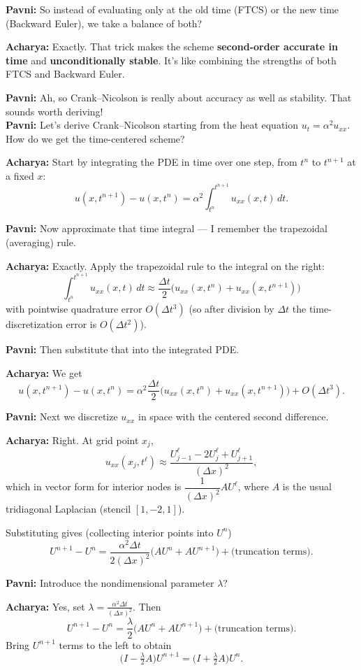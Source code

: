 \documentclass[
  letterpaper,
]{book}
\begin{document}
\textbf{Pavni:} So instead of evaluating only at the old time (FTCS) or
the new time (Backward Euler), we take a balance of both?

\textbf{Acharya:} Exactly. That trick makes the scheme
\textbf{second-order accurate in time} and \textbf{unconditionally
stable}. It's like combining the strengths of both FTCS and Backward
Euler.

\textbf{Pavni:} Ah, so Crank--Nicolson is really about accuracy as well
as stability. That sounds worth deriving!\\
\textbf{Pavni:} Let's derive Crank--Nicolson starting from the heat
equation \(u_t=\alpha^2 u_{xx}\). How do we get the time-centered
scheme?

\textbf{Acharya:} Start by integrating the PDE in time over one step,
from \(t^n\) to \(t^{n+1}\) at a fixed \(x\): \[
u(x,t^{n+1})-u(x,t^n)=\alpha^2\int_{t^n}^{t^{n+1}} u_{xx}(x,t)\,dt.
\]

\textbf{Pavni:} Now approximate that time integral --- I remember the
trapezoidal (averaging) rule.

\textbf{Acharya:} Exactly. Apply the trapezoidal rule to the integral on
the right: \[
\int_{t^n}^{t^{n+1}} u_{xx}(x,t)\,dt
\approx \frac{\Delta t}{2}\big(u_{xx}(x,t^n)+u_{xx}(x,t^{n+1})\big)
\] with pointwise quadrature error \(O(\Delta t^3)\) (so after division
by \(\Delta t\) the time-discretization error is \(O(\Delta t^2)\)).

\textbf{Pavni:} Then substitute that into the integrated PDE.

\textbf{Acharya:} We get \[
u(x,t^{n+1})-u(x,t^n)
= \alpha^2\frac{\Delta t}{2}\big(u_{xx}(x,t^n)+u_{xx}(x,t^{n+1})\big) + O(\Delta t^3).
\]

\textbf{Pavni:} Next we discretize \(u_{xx}\) in space with the centered
second difference.

\textbf{Acharya:} Right. At grid point \(x_j\), \[
u_{xx}(x_j,t^\ell)\approx \frac{U_{j-1}^\ell-2U_j^\ell+U_{j+1}^\ell}{(\Delta x)^2},
\] which in vector form for interior nodes is
\(\dfrac{1}{(\Delta x)^2}A U^\ell\), where \(A\) is the usual
tridiagonal Laplacian (stencil \([1,-2,1]\)).

Substituting gives (collecting interior points into \(U^n\)) \[
U^{n+1}-U^n = \frac{\alpha^2\Delta t}{2(\Delta x)^2}\big(AU^n + AU^{n+1}\big) + \text{(truncation terms)}.
\]

\textbf{Pavni:} Introduce the nondimensional parameter \(\lambda\)?

\textbf{Acharya:} Yes, set
\(\displaystyle \lambda=\frac{\alpha^2\Delta t}{(\Delta x)^2}\). Then \[
U^{n+1}-U^n = \frac{\lambda}{2}\big(AU^n + AU^{n+1}\big) + \text{(truncation terms)}.
\] Bring \(U^{n+1}\) terms to the left to obtain \[
\Big(I-\tfrac{\lambda}{2}A\Big)U^{n+1} = \Big(I+\tfrac{\lambda}{2}A\Big)U^n.
\]
\end{document}
